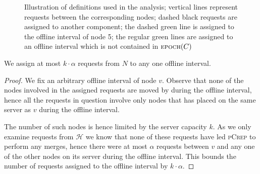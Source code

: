 \documentclass[a4paper,UKenglish,cleveref, autoref, thm-restate,authorcolumns]{../lipics/lipics-v2019}
\newcommand{\adjDel}{\textsc{pCrep}}
\newcommand{\opt}{\text{O{\scriptsize PT}}}
\newcommand{\epoch}{\text{\scriptsize EPOCH}}
\begin{document}
\begin{center}
\begin{figure}
		\centering
		\caption{Illustration of definitions used in the analysis; vertical lines 
		represent requests between the corresponding nodes; dashed black requests 
		are assigned to another component; the dashed green line is assigned to 
		the offline interval of node 5; the regular green lines are assigned to 
		an offline interval which is not contained in $\epoch(C)$}\label{analysis_def_illustration}
	\end{figure}
\end{center}

\begin{lemma}
	\label{offl_int_lemma}
	We assign at most $k\cdot\alpha$ requests from $N$ to any one offline interval.
\end{lemma}

\begin{proof}
	We fix an arbitrary offline interval of node $v$. Observe that none of the nodes involved in the assigned requests are moved by \opt{} during the offline interval, hence all the requests in question involve only nodes that \opt{} has placed on the same server as $v$ during the offline interval. 
	
	The number of such nodes is hence limited by the server capacity $k$. As we only examine requests from $\mathcal{H}$ we know that none of these requests have led \adjDel{} to perform any merges, hence there were at most $\alpha$ requests between $v$ and any one of the other nodes on its server during the offline interval. This bounds the number of requests assigned to the offline interval by $k\cdot\alpha$.
\end{proof}
\end{document}
